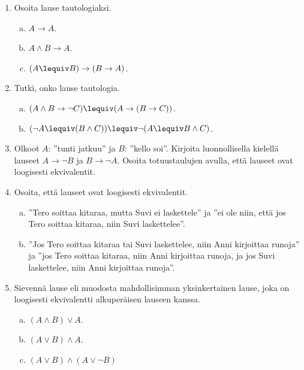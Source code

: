 \begin{kotitehtavasivu}


\begin{enumerate}

\item Osoita lause tautologiaksi.
\begin{enumerate}[a)]
\item $A\to A$.
\item $A\land B \to A$.
\item $(A\lequiv B) \to (B\to A)$.

\end{enumerate}

\item Tutki, onko lause tautologia.
\begin{enumerate}[a)]
\item $(A\land B \to \lnot C)\lequiv (A\to(B\to C))$.
\item $(\lnot A \lequiv (B \land C)) \lequiv \lnot (A
\lequiv B \land C)$.
\end{enumerate}

\item Olkoot $A$: ''tunti jatkuu'' ja $B$: ''kello soi''.
Kirjoita luonnollisella kielellä lauseet $A\to \lnot B$
ja $B\to \lnot A$. Osoita totuustaulujen avulla, että
lauseet ovat loogisesti ekvivalentit.

\item Osoita, että lauseet ovat loogisesti ekvivalentit.
\begin{enumerate}[a)]
\item ''Tero soittaa kitaraa, mutta Suvi ei
laskettele'' ja ''ei ole niin, että jos Tero soittaa
kitaraa, niin Suvi laskettelee''.
\item ''Jos Tero soittaa kitaraa tai Suvi laskettelee,
niin Anni kirjoittaa runoja'' ja ''jos Tero soittaa
kitaraa, niin Anni kirjoittaa runoja, ja jos Suvi
laskettelee, niin Anni kirjoittaa runoja''.
\end{enumerate}

\item Sievennä lause eli muodosta mahdollisimman
yksinkertainen lause, joka on loogisesti ekvivalentti
alkuperäisen lauseen kanssa.
\begin{enumerate}[a)]
\item $(A\land B) \lor A$.
\item $(A\lor B) \land A$.
\item $(A\lor B) \land (A\lor \lnot B)$
\end{enumerate}


\end{enumerate}
\end{kotitehtavasivu}
